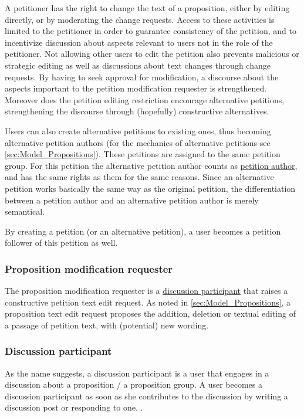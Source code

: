 A petitioner has the right to change the text of a proposition, either by editing directly, or by moderating the change requests. Access to these activities is limited to the petitioner in order to guarantee consistency of the petition, and to incentivize discussion about aspects relevant to users not in the role of the petitioner. Not allowing other users to edit the petition also prevents malicious or strategic editing as well as discussions about text changes through change requests. By having to seek approval for modification, a discourse about the aspects important to the petition modification requester is strengthened.
Moreover does the petition editing restriction encourage alternative petitions, strengthening the discourse through (hopefully) constructive alternatives.

Users can also create alternative petitions to existing ones, thus becoming alternative petition authors (for the mechanics of alternative petitions see \ref{sec:Model_Propositions}). These petitions are assigned to the same petition group. For this petition the alternative petition author counts as \hyperref[ssec:Roles_Petitioner]{petition author}, and has the same rights as them for the same reasons. Since an alternative petition works basically the same way as the original petition, the differentiation between a petition author and an alternative petition author is merely semantical. 

By creating a petition (or an alternative petition), a user becomes a petition follower of this petition as well.

\subsubsection{Proposition modification requester}
The proposition modification requester is a \hyperref[ssec:Roles_DiscussionParticipant]{discussion participant} that raises a constructive petition text edit request. 
As noted in \ref{sec:Model_Propositions}, a proposition text edit request proposes the addition, deletion or textual editing of a passage of petition text, with (potential) new wording. 

\subsubsection{Discussion participant}
\label{ssec:Roles_DiscussionParticipant}
As the name suggests, a discussion participant is a user that engages in a discussion about a proposition / a proposition group. A user becomes a discussion participant as soon as she contributes to the discussion by writing a discussion post or responding to one. .

